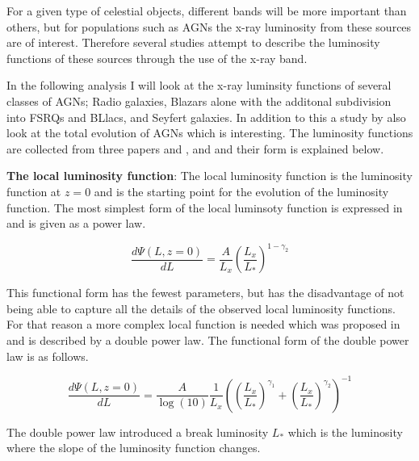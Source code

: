 \documentclass{article}
\begin{document}

For a given type of celestial objects, different bands will be more important than others, but for populations such as AGNs
 the x-ray luminosity from these sources are of interest. 
Therefore several studies attempt to describe the luminosity functions of these sources through the use of the x-ray band. 

In the following analysis I will look at the x-ray luminsity functions of several classes of AGNs; Radio galaxies, Blazars alone with the additonal subdivision into FSRQs and BLlacs, and Seyfert galaxies. In addition to this 
a study by \cite{Ueda_2014} also look at the total evolution of AGNs which is interesting. The luminosity functions are collected from three papers \cite{Ajello_2009} and \cite{Silverman_2008}, and \cite{Ueda_2014} and their form is explained below.

\textbf{The local luminosity function}:
The local luminosity function is the luminosity function at $z=0$ and is the starting point for the evolution of the luminosity function.
The most simplest form of the local luminsoty function is expressed in \cite{Ajello_2009} and is given as a power law.

\begin{equation}
    \frac{d\Psi(L,z=0)}{dL} = \frac{A}{L_x} \left( \frac{L_x}{L_*}\right)^{1-\gamma_2}
\end{equation}

This functional form has the fewest parameters, but has the disadvantage of not being able to capture all the details of the observed local luminosity functions.
For that reason a more complex local function is needed which was proposed in \cite{Ueda_2003} and is described by a double power law.
The functional form of the double power law is as follows.


   
\begin{equation}
    \frac{d\Psi(L,z=0)}{dL} =  \frac{A}{\log(10)} \frac{1}{L_x} \left( \left( \frac{L_x}{L_*} \right)^{\gamma_1} + \left( \frac{L_x}{L_*} \right)^{\gamma_2} \right)^{-1}
\end{equation}

The double power law introduced a break luminosity $L_*$ which is the luminosity where the slope of the luminosity function changes.
\end{document}
